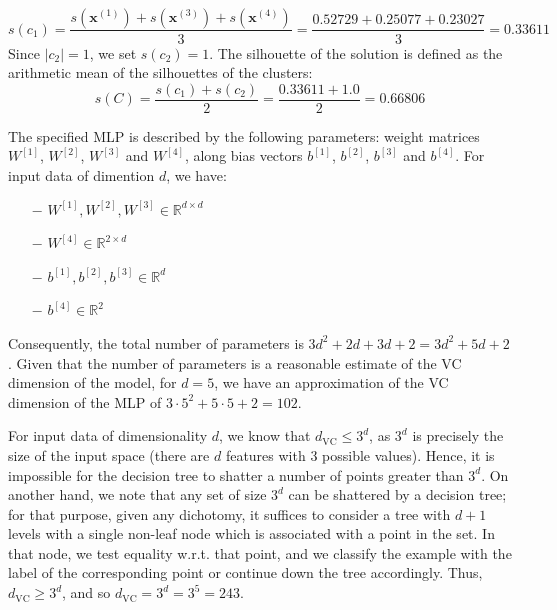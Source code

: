\documentclass{exam}
\begin{document}
\begin{questions}
\begin{align*}
            \end{align*}
            \vspace{-2.2em}
            \[
                s(c_1) = \frac{ s(\textbf{x}^{(1)}) +  s(\textbf{x}^{(3)}) +  s(\textbf{x}^{(4)})}{3} = \frac{0.52729 + 0.25077 + 0.23027}{3} = 0.33611
            \]
            Since $|c_2| = 1$, we set $s(c_2) = 1$. The  silhouette of the solution is defined as the arithmetic mean of the silhouettes of the clusters:
            \vspace{1em}
            \[
                s(C) = \frac{s(c_1) + s(c_2)}{2} = \frac{0.33611 + 1.0}{2} = 0.66806
            \]
        \item \quad
        \begin{parts}
            \item \vspace{-1.6em}
            \begin{subparts}
                \item The specified MLP is described by the following parameters: weight matrices $W^{[1]}$, $W^{[2]}$, $W^{[3]}$ and $W^{[4]}$, along bias vectors $b^{[1]}$, $b^{[2]}$, $b^{[3]}$ and $b^{[4]}$. For input data of dimention $d$, we have:
                \vspace{0.5em}
                \begin{itemize}
                    \item[$-$] $W^{[1]}, W^{[2]}, W^{[3]} \in \mathbb{R}^{d \times d}$
                    \item[$-$] $W^{[4]} \in \mathbb{R}^{2 \times d}$
                    \item[$-$] $b^{[1]}, b^{[2]}, b^{[3]} \in \mathbb{R}^{d}$
                    \item[$-$] $b^{[4]} \in \mathbb{R}^{2}$
                \end{itemize} 
                \vspace{0.5em}
                Consequently, the total number of parameters is $3d^2 + 2d + 3d + 2 = 3d^2 + 5d + 2$. Given that the number of parameters is a reasonable estimate of the VC dimension of the model, for $d = 5$, we have an approximation of the VC dimension of the MLP of $3 \cdot 5^2 + 5 \cdot 5 + 2 = 102.$ 
                \vspace{0.8em}
                \item For input data of dimensionality $d$, we know that $d_{\text{VC}} \le 3^d$, as $3^d$ is precisely the size of the input space (there are $d$ features with 3 possible values). Hence, it is impossible for the decision tree to shatter a number of points greater than $3^d$. On another hand, we note that any set of size $3^d$ can be shattered by a decision tree; for that purpose, given any dichotomy, it suffices to consider a tree with $d + 1$ levels with a single non-leaf node which is associated with a point in the set. In that node, we test equality w.r.t. that point, and we classify the example with the label of the corresponding point or continue down the tree accordingly. Thus, $d_{\text{VC}} \ge 3^d$, and so $d_{\text{VC}} = 3^d = 3^5 = 243$.

\end{subparts}
\end{parts}
\end{questions}
\end{document}
